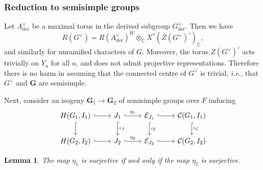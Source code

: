 \documentclass[10pt]{article}
\newcommand{\Ee}{\mathcal{E}}
\newcommand{\C}{\mathbb{C}}
\newcommand{\G}{\mathbf{G}}
\newtheorem{lem}{Lemma}
\theoremstyle{definition}
\theoremstyle{remark}
\begin{document}
\subsubsection{Reduction to semisimple groups}
\label{subsubsection reduction to semisimple groups}
%
Let $A^\vee_{\mathrm{der}}$ be a maximal torus in the derived subgroup $G^\vee_{\mathrm{der}}$. Then we have
%
\[
R(G^\vee)=R(A^\vee_{\mathrm{der}})^W\otimes_\C X^*(Z(G^\vee)^\circ)_\C,
\]
%
and similarly for unramified characters of $G$.
Moreover, 
the torus $Z(G^\vee)^\circ$ acts trivially on $Y_u$ for all $u$,
and does not admit projective representations.
Therefore there is no harm in assuming that the connected centre of 
$G^\vee$ is trivial, \textit{i.e.}, that $G^\vee$ and $\G$ are 
semisimple.

Next, consider an isogeny $\G_1\to\G_2$ of semisimple groups over $F$ inducing
%
\begin{equation*}
\begin{tikzcd}
H(G_1,I_1)\arrow[d, hook]\arrow[r, hook]&J_1\arrow[r, hook, "\eta_1"]\arrow[d, hook, "\iota_J"]&\Ee_{J_1}\arrow[r,hook]\arrow[d, hook, "\iota_\Ee"]&\mathcal{C}(G_1,I_1)\arrow[d,hook, "\iota_\mathcal{C}"]\\
H(G_2,I_2)\arrow[r, hook]&J_2\arrow[r, hook, "\eta_2"]&\Ee_{J_2}\arrow[r,hook]&\mathcal{C}(G_2,I_2)
\end{tikzcd}
\end{equation*}
%
\begin{lem}
\label{lem suffices to show surjectivity for one member of isogeny class}
The map $\eta_1$ is surjective if and only if the map $\eta_2$ is surjective.
\end{lem}
%
\end{document}
